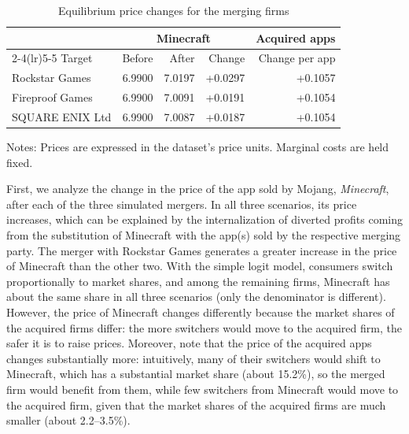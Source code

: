 \documentclass{article}
\begin{document}
\begin{table}[htbp]
\centering
\caption{Equilibrium price changes for the merging firms}
\label{tab:merger-prices}
\begin{tabular}{lrrrr}
\toprule
& \multicolumn{3}{c}{Minecraft}
& Acquired apps \\
\cmidrule(lr){2-4}\cmidrule(lr){5-5}
Target & Before & After & Change & Change per app \\
\midrule
Rockstar Games  & 6.9900 & 7.0197 & +0.0297 & +0.1057 \\
Fireproof Games & 6.9900 & 7.0091 & +0.0191 & +0.1054 \\
SQUARE ENIX Ltd & 6.9900 & 7.0087 & +0.0187 & +0.1054 \\
\bottomrule
\end{tabular}

\smallskip
\begin{minipage}{0.95\textwidth}
\footnotesize
Notes: Prices are expressed in the dataset's price units. Marginal costs are held fixed.
\end{minipage}
\end{table}

First, we analyze the change in the price of the app sold by Mojang, \textit{Minecraft}, after each of the three simulated mergers. In all three scenarios, its price increases, which can be explained by the internalization of diverted profits coming from the substitution of Minecraft with the app(s) sold by the respective merging party. The merger with Rockstar Games generates a greater increase in the price of Minecraft than the other two. With the simple logit model, consumers switch proportionally to market shares, and among the remaining firms, Minecraft has about the same share in all three scenarios (only the denominator is different). However, the price of Minecraft changes differently because the market shares of the acquired firms differ: the more switchers would move to the acquired firm, the safer it is to raise prices. Moreover, note that the price of the acquired apps changes substantially more: intuitively, many of their switchers would shift to Minecraft, which has a substantial market share (about 15.2\%), so the merged firm would benefit from them, while few switchers from Minecraft would move to the acquired firm, given that the market shares of the acquired firms are much smaller (about 2.2--3.5\%).
\end{document}
